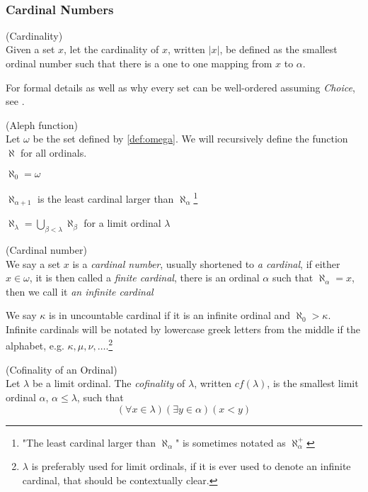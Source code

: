 \

\subsubsection{Cardinal Numbers}

\begin{definition}{(Cardinality)}\\
Given a set $x$, let the cardinality of $x$, written $|x|$, be defined as the smallest ordinal number such that there is a one to one mapping from $x$ to $\alpha$.
\end{definition}
For formal details as well as why every set can be well-ordered assuming \emph{Choice}, see \cite{JechBook}.

\begin{definition}{(Aleph function)}\label{def:aleph}\\
Let $\omega$ be the set defined by \ref{def:omega}.
We will recursively define the function $\aleph$ for all ordinals.
\bce[(i)]
\item $\aleph_0 = \omega$
\item $\aleph_{\alpha+1}$ is the least cardinal larger than $\aleph_\alpha$\footnote{"The least cardinal larger than $\aleph_\alpha$" is sometimes notated as $\aleph_\alpha^{+}$}
\item $\aleph_\lambda = \bigcup_{\beta < \lambda}\aleph_\beta$ for a limit ordinal $\lambda$
\ece
\end{definition}

\begin{definition}{(Cardinal number)}\label{def:cardinal}\\
We say a set $x$ is a \emph{cardinal number}, usually shortened to \emph{a cardinal}, if either $x \in \omega$, it is then called a \emph{finite cardinal}, 
there is an ordinal $\alpha$ such that $\aleph_\alpha = x$, then we call it \emph{an infinite cardinal}
\end{definition}
We say $\kappa$ is in uncountable cardinal if it is an infinite ordinal and $\aleph_0 > \kappa$.
Infinite cardinals will be notated by lowercase greek letters from the middle if the alphabet, e.g. $\kappa, \mu, \nu, \ldots$.\footnote{$\lambda$ is preferably used for limit ordinals, if it is ever used to denote an infinite cardinal, that should be contextually clear.}

\begin{definition}{(Cofinality of an Ordinal)}\label{def:cofinality}\\ %
Let $\lambda$ be a limit ordinal. The \emph{cofinality} of $\lambda$, written $cf(\lambda)$, is the smallest limit ordinal $\alpha$, $\alpha \leq \lambda$, such that 
\begin{equation}
(\forall x \in \lambda)(\exists y \in \alpha)(x < y)
\end{equation}
\end{definition}

